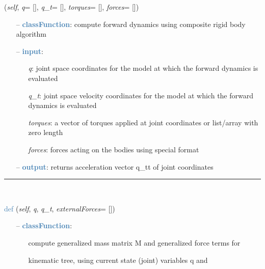 \begin{itemize}[leftmargin=1.4cm]
\begin{itemize}[leftmargin=1.4cm]
\begin{itemize}[leftmargin=0.5cm]
\begin{itemize}[leftmargin=1.4cm]
\begin{itemize}[leftmargin=1.4cm]
\begin{itemize}[leftmargin=0.5cm]
\begin{itemize}[leftmargin=1.4cm]
\begin{itemize}[leftmargin=0.5cm]
\begin{itemize}[leftmargin=1.4cm]
\begin{itemize}[leftmargin=1.4cm]
\begin{itemize}[leftmargin=1.4cm]
\begin{flushleft}
({\it self}, {\it q}= [], {\it q\_t}= [], {\it torques}= [], {\it forces}= [])
\end{flushleft}
\setlength{\itemindent}{0.7cm}
\begin{itemize}[leftmargin=0.7cm]
  \item[--]  \textcolor{steelblue}{\bf classFunction}: compute forward dynamics using composite rigid body algorithm  \item[--]  \textcolor{steelblue}{\bf input}: \vspace{-6pt}
  \begin{itemize}[leftmargin=1.2cm]
\setlength{\itemindent}{-0.7cm}
    \item[] {\it q}: joint space coordinates for the model at which the forward dynamics is evaluated
    \item[] {\it   q\_t}: joint space velocity coordinates for the model at which the forward dynamics is evaluated
    \item[] {\it   torques}: a vector of torques applied at joint coordinates or list/array with zero length
    \item[] {\it   forces}: forces acting on the bodies using special format
  \end{itemize}
  \item[--]  \textcolor{steelblue}{\bf output}: returns acceleration vector q\_tt of joint coordinates\vspace{12pt}\end{itemize}
%
\noindent\rule{8cm}{0.75pt}\vspace{1pt} \\ 
\begin{flushleft}
\noindent \textcolor{steelblue}{def {\bf {}}}\label{sec:kinematicTree:KinematicTree33:ComputeMassMatrixAndForceTerms}
({\it self}, {\it q}, {\it q\_t}, {\it externalForces}= [])
\end{flushleft}
\setlength{\itemindent}{0.7cm}
\begin{itemize}[leftmargin=0.7cm]
  \item[--]  \textcolor{steelblue}{\bf classFunction}: \vspace{-6pt}
  \begin{itemize}[leftmargin=1.2cm]
\setlength{\itemindent}{-0.7cm}
    \item[] compute generalized mass matrix M and generalized force terms for
    \item[]             kinematic tree, using current state (joint) variables q and

\end{itemize}
\end{itemize}
\end{itemize}
\end{itemize}
\end{itemize}
\end{itemize}
\end{itemize}
\end{itemize}
\end{itemize}
\end{itemize}
\end{itemize}
\end{itemize}
\end{itemize}
